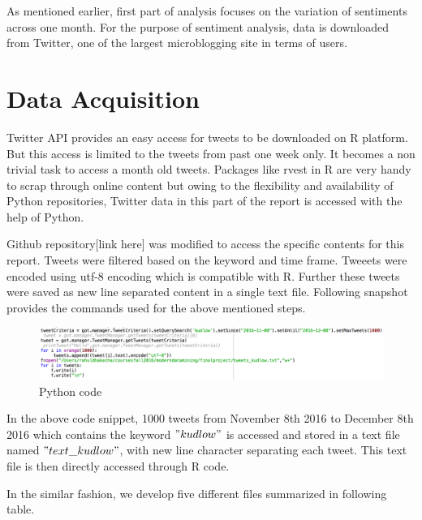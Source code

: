 \documentclass[a4paper,12pt]{book}
\theoremstyle{break}
\begin{document}
As mentioned earlier, first part of analysis focuses on the variation of sentiments across one month. For the purpose of sentiment analysis, data is downloaded from Twitter, one of the largest microblogging site in terms of users. 

\section{Data Acquisition}

Twitter API provides an easy access for tweets to be downloaded on R platform. But this access is limited to the tweets from past one week only. It becomes a non trivial task to access a month old tweets. Packages like rvest in R are very handy to scrap through online content but owing to the flexibility and availability of Python repositories, Twitter data in this part of the report is accessed with the help of Python. 

Github repository[link here] was modified to access the specific contents for this report. Tweets were filtered based on the keyword and time frame. Tweeets were encoded using utf-8 encoding which is compatible with R. Further these tweets were saved as new line separated content in a single text file. Following snapshot provides the commands used for the above mentioned steps.

\begin{figure}[H]
\centering
\includegraphics[scale=1.0]{snapshot1.png}
\caption{Python code}
\label{fig:2}
\end{figure}

In the above code snippet, 1000 tweets from November 8th 2016 to December 8th 2016 which contains the keyword $"kudlow"$ is accessed and stored in a text file named $"text\_kudlow"$, with new line character separating each tweet. This text file is then directly accessed through R code.


In the similar fashion, we develop five different files summarized in following table.
\end{document}
